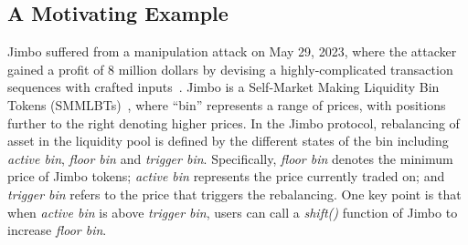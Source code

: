 


    

\subsection{A Motivating Example}
\label{sec:motivation}
Jimbo suffered from a manipulation attack on May 29, 2023, where the attacker gained a profit of 8 million dollars by devising a highly-complicated transaction sequences with crafted inputs~\cite{Jimbo}.
Jimbo is a Self-Market Making Liquidity Bin Tokens (SMMLBTs)~\cite{SMMLBTs}, where ``bin'' represents a range of prices, with positions further to the right denoting higher prices.  In the Jimbo protocol, rebalancing of asset in the liquidity pool is defined by the different states of the bin including \textit{active bin}, \textit{floor bin} and \textit{trigger bin}. 
Specifically,
\textit{floor bin} denotes the minimum price of Jimbo tokens; \textit{active bin} represents the price currently traded on; and \textit{trigger bin} refers to the price that triggers the rebalancing.
One key point is that when \textit{active bin} is above \textit{trigger bin}, users can call a \textit{shift()} function of Jimbo to increase \textit{floor bin}.

